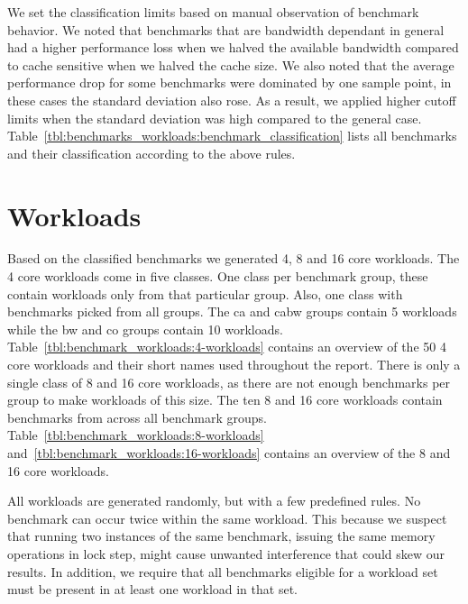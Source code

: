 We set the classification limits based on manual observation of benchmark behavior. 
We noted that benchmarks that are bandwidth dependant in general had a higher performance loss when we halved the available bandwidth compared to cache sensitive when we halved the cache size.
We also noted that the average performance drop for some benchmarks were dominated by one sample point, in these cases the standard deviation also rose. 
As a result, we applied higher cutoff limits when the standard deviation was high compared to the general case.
Table~\ref{tbl:benchmarks_workloads:benchmark_classification} lists all benchmarks and their classification according to the above rules.


\section{Workloads}

Based on the classified benchmarks we generated 4, 8 and 16 core workloads.
The 4 core workloads come in five classes.
One class per benchmark group, these contain workloads only from that particular group.
Also, one class with benchmarks picked from all groups.
The ca and cabw groups contain 5 workloads while the bw and co groups contain 10 workloads.
Table~\ref{tbl:benchmark_workloads:4-workloads} contains an overview of the 50 4 core workloads and their short names used throughout the report.
There is only a single class of 8 and 16 core workloads, as there are not enough benchmarks per group to make workloads of this size. 
The ten 8 and 16 core workloads contain benchmarks from across all benchmark groups.
Table~\ref{tbl:benchmark_workloads:8-workloads} and~\ref{tbl:benchmark_workloads:16-workloads} contains an overview of the 8 and 16 core workloads.

All workloads are generated randomly, but with a few predefined rules.
No benchmark can occur twice within the same workload.
This because we suspect that running two instances of the same benchmark, issuing the same memory operations in lock step, might cause unwanted interference that could skew our results. 
In addition, we require that all benchmarks eligible for a workload set must be present in at least one workload in that set.